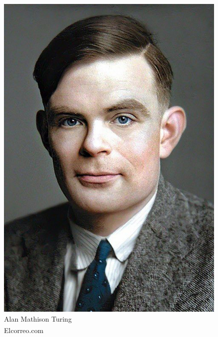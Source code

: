 \begin{frame}[t]
{\begin{minipage}[t]{\textwidth}
\begin{minipage}[t]{0.6\textwidth}
\begin{itemize}[leftmargin=10pt,align=right]
\begin{itemize}[leftmargin=10pt,align=right]
						\end{itemize}
					\end{itemize}
            	\end{minipage}
            	\begin{minipage}[t]{0.4\textwidth}
                	\centering
                	\begin{figure}[ht]
						\includegraphics[width=.6\textwidth]{img/alan-turing-color.png}
						{\tiny\\Alan Mathison Turing\\\textsuperscript{\textcopyright}Elcorreo.com}
                	\end{figure}
            	\end{minipage}
	    	\end{minipage}
	}
\end{frame}
%
